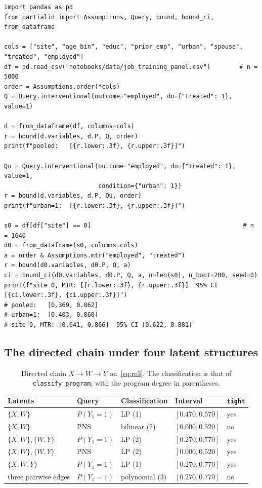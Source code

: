 \begin{lstlisting}
import pandas as pd
from partialid import Assumptions, Query, bound, bound_ci, from_dataframe

cols = ["site", "age_bin", "educ", "prior_emp", "urban", "spouse", "treated", "employed"]
df = pd.read_csv("notebooks/data/job_training_panel.csv")        # n = 5000
order = Assumptions.order(*cols)
Q = Query.interventional(outcome="employed", do={"treated": 1}, value=1)

d = from_dataframe(df, columns=cols)
r = bound(d.variables, d.P, Q, order)
print(f"pooled:   [{r.lower:.3f}, {r.upper:.3f}]")

Qu = Query.interventional(outcome="employed", do={"treated": 1}, value=1,
                          condition={"urban": 1})
r = bound(d.variables, d.P, Qu, order)
print(f"urban=1:  [{r.lower:.3f}, {r.upper:.3f}]")

s0 = df[df["site"] == 0]                                          # n = 1640
d0 = from_dataframe(s0, columns=cols)
a = order & Assumptions.mtr("employed", "treated")
r = bound(d0.variables, d0.P, Q, a)
ci = bound_ci(d0.variables, d0.P, Q, a, n=len(s0), n_boot=200, seed=0)
print(f"site 0, MTR: [{r.lower:.3f}, {r.upper:.3f}]  95% CI [{ci.lower:.3f}, {ci.upper:.3f}]")
# pooled:   [0.369, 0.862]
# urban=1:  [0.403, 0.860]
# site 0, MTR: [0.641, 0.866]  95% CI [0.622, 0.881]
\end{lstlisting}

\subsection{The directed chain under four latent structures}
\label{app:code-chain}

\begin{table}[ht]
\centering
\caption{Directed chain $X\to W\to Y$ on~\eqref{eq:re3}. The classification
is that of \texttt{classify\_program}, with the program degree in
parentheses.}
\label{tab:audit}
\small
\begin{tabular}{@{}lllll@{}}
\toprule
Latents & Query & Classification & Interval & \texttt{tight} \\
\midrule
$\{X,W\}$ & $P(Y_1{=}1)$ & LP (1) & $[0.470,0.570]$ & yes \\
$\{X,W\}$ & PNS & bilinear (2) & $[0.000,0.520]$ & no \\
$\{X,W\},\{W,Y\}$ & $P(Y_1{=}1)$ & LP (2) & $[0.270,0.770]$ & yes \\
$\{X,W\},\{W,Y\}$ & PNS & LP (2) & $[0.000,0.520]$ & yes \\
$\{X,W,Y\}$ & $P(Y_1{=}1)$ & LP (1) & $[0.270,0.770]$ & yes \\
three pairwise edges & $P(Y_1{=}1)$ & polynomial (3) & $[0.270,0.770]$ & no \\
\bottomrule
\end{tabular}
\end{table}

